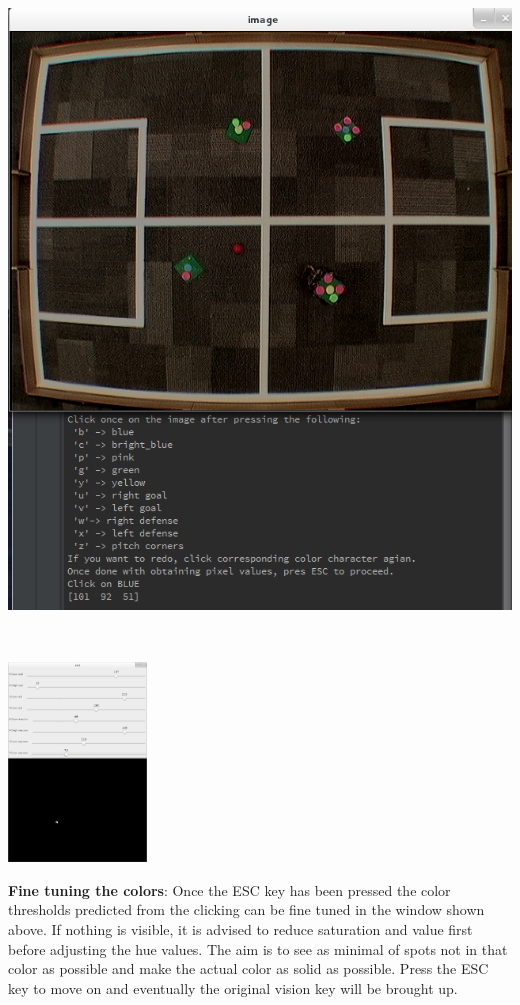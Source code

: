 \documentclass[a4paper,12pt]{article}
\begin{document}
\begin{minipage}{0.5\textwidth}
\centering
\includegraphics[scale=0.25]{images/calibration2.png}
\end{minipage}
~
\begin{minipage}{0.5\textwidth}
\centering
\includegraphics[height=200px]{images/calibration3.png}
\end{minipage}

\textbf{Fine tuning the colors}: Once the ESC key has been pressed the color thresholds predicted from the clicking can be fine tuned in the window shown above. If nothing is visible, it is advised to reduce saturation and value first before adjusting the hue values. The aim is to see as minimal of spots not in that color as possible and make the actual color as solid as possible. Press the ESC key to move on and eventually the original vision key will be brought up.
\end{document}
